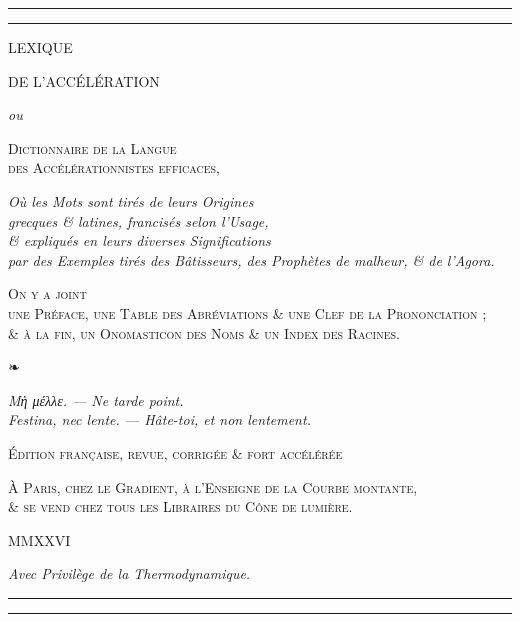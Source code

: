 \documentclass[10pt,twoside]{article}
\begin{document}
\pagestyle{empty}

\begin{titlepage}
\centering
\vspace*{4mm}
{\color{rubric}\rule{\textwidth}{1.2pt}}\par\vspace{1.2pt}
\rule{\textwidth}{0.4pt}\par
\vspace{13mm}
{\dispfont\fontsize{38}{40}\selectfont LEXIQUE\par}
\vspace{2mm}
{\dispfont\fontsize{22}{26}\selectfont\color{rubric} DE L'ACCÉLÉRATION\par}
\vspace{8mm}
{\large\itshape ou\par}
\vspace{3mm}
{\Large\scshape Dictionnaire de la Langue\\[2pt] des Accélérationnistes efficaces,\par}
\vspace{6mm}
{\normalsize\itshape
Où les Mots sont tirés de leurs Origines\\
\textup{grecques} \& \textup{latines}, francisés selon l'Usage,\\
\& expliqués en leurs diverses Significations\\
par des Exemples tirés des Bâtisseurs, des Prophètes de malheur, \& de l'Agora.\par}
\vspace{9mm}
{\small\scshape On y a joint\\
une Préface, une Table des Abréviations \& une Clef de la Prononciation ;\\
\& à la fin, un Onomasticon des Noms \& un Index des Racines.\par}
\vspace{12mm}
{\color{rubric}\Large ❧\par}
\vspace{10mm}
{\small\itshape
Μὴ μέλλε. — \textup{Ne tarde point.}\\[3pt]
Festina, nec lente. — \textup{Hâte-toi, et non lentement.}\par}
\vfill
{\scshape Édition française, revue, corrigée \& fort accélérée\par}
\vspace{3mm}
{\small\scshape À Paris, chez le Gradient, à l'Enseigne de la Courbe montante,\\
\& se vend chez tous les Libraires du Cône de lumière.\par}
\vspace{2mm}
{\liningfont\small MMXXVI\par}
\vspace{1mm}
{\footnotesize\itshape Avec Privilège de la Thermodynamique.\par}
\vspace{5mm}
\rule{\textwidth}{0.4pt}\par\vspace{1.2pt}
{\color{rubric}\rule{\textwidth}{1.2pt}}
\end{titlepage}
\end{document}
